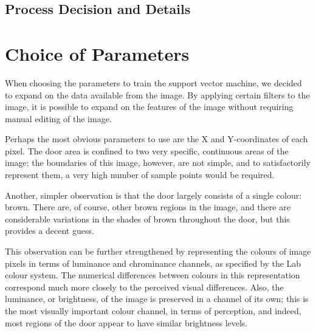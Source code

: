 \section{Process Decision and Details}

\chapter{Choice of Parameters}

When choosing the parameters to train the support vector machine, we decided to expand on the data available from the image. By applying certain filters to the image, it is possible to expand on the features of the image without requiring manual editing of the image.

Perhaps the most obvious parameters to use are the X and Y-coordinates of each pixel.  The door area is confined to two very specific, continuous areas of the image; the boundaries of this image, however, are not simple, and to satisfactorily represent them, a very high number of sample points would be required.

Another, simpler observation is that the door largely consists of a single colour: brown.  There are, of course, other brown regions in the image, and there are considerable variations in the shades of brown throughout the door, but this provides a decent guess.  

This observation can be further strengthened by representing the colours of image pixels in terms of luminance and chrominance channels, as specified by the Lab colour system. The numerical differences between colours in this representation correspond much more closely to the perceived visual differences.  Also, the luminance, or brightness, of the image is preserved in a channel of its own; this is the most visually important colour channel, in terms of perception, and indeed, most regions of the door appear to have similar brightness levels.


